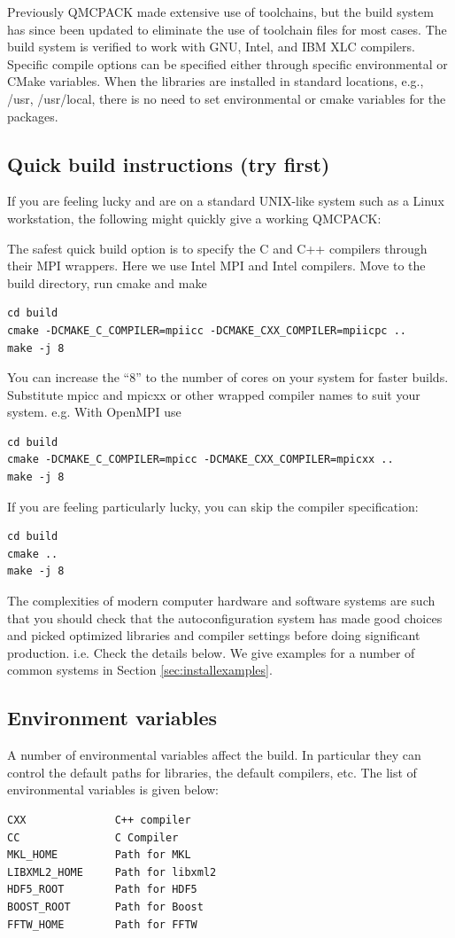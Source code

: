 Previously QMCPACK made extensive use of toolchains, but the build system
has since been updated to eliminate the use of toolchain files for
most cases.  The build system is verified to work with GNU, Intel, and IBM XLC
compilers.  Specific compile options can be specified either through
specific environmental or CMake variables.  When the libraries are
installed in standard locations, e.g., /usr, /usr/local, there is no
need to set environmental or cmake variables for the packages.

\subsection{Quick build instructions (try first)}
\label{sec:cmakequick}

If you are feeling lucky and are on a standard UNIX-like system such
as a Linux workstation, the following might quickly give a
working QMCPACK:

The safest quick build option is to specify the C and C++ compilers
through their MPI wrappers. Here we use Intel MPI and Intel
compilers. Move to the build directory, run cmake and make
\begin{verbatim}
cd build
cmake -DCMAKE_C_COMPILER=mpiicc -DCMAKE_CXX_COMPILER=mpiicpc ..
make -j 8
\end{verbatim}
You can increase the ``8'' to the number of cores on your system for
faster builds. Substitute mpicc and mpicxx or other wrapped compiler names to suit
  your system. e.g. With OpenMPI use
\begin{verbatim}
cd build
cmake -DCMAKE_C_COMPILER=mpicc -DCMAKE_CXX_COMPILER=mpicxx ..
make -j 8
\end{verbatim}

If you are feeling particularly lucky, you can skip the compiler specification:
\begin{verbatim}
cd build
cmake ..
make -j 8
\end{verbatim}

The complexities of modern computer hardware and software systems are
such that you should check that the autoconfiguration system has made
good choices and picked optimized libraries and compiler settings
before doing significant production. i.e. Check the details below. We
give examples for a number of common systems in Section \ref{sec:installexamples}.

\subsection{Environment variables}
\label{sec:envvar}
A number of environmental variables affect the build.  In particular
they can control the default paths for libraries, the default
compilers, etc.  The list of environmental variables is given below:
\begin{verbatim}
CXX              C++ compiler
CC               C Compiler
MKL_HOME         Path for MKL
LIBXML2_HOME     Path for libxml2
HDF5_ROOT        Path for HDF5
BOOST_ROOT       Path for Boost
FFTW_HOME        Path for FFTW
\end{verbatim}

